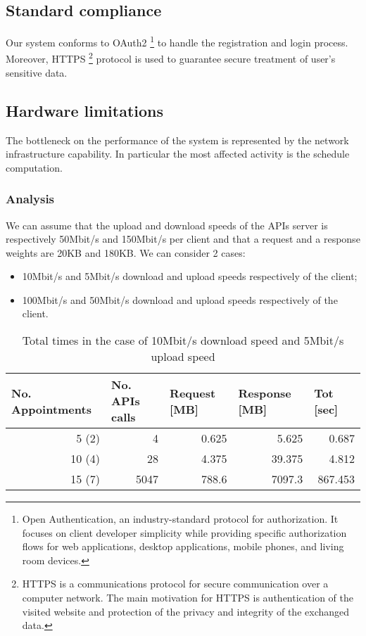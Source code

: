\subsection{Standard compliance}
Our system conforms to OAuth2 \footnote{Open Authentication, an industry-standard protocol for authorization. It focuses on client developer simplicity while providing specific authorization flows for web applications, desktop applications, mobile phones, and living room devices.} to handle the registration and login process. 
Moreover, HTTPS \footnote{HTTPS is a communications protocol for secure communication over a computer network. The main motivation for HTTPS is authentication of the visited website and protection of the privacy and integrity of the exchanged data.} protocol is used to guarantee secure treatment of user's sensitive data.

\subsection{Hardware limitations}
The bottleneck on the performance of the system is represented by the network infrastructure capability. In particular the most affected activity is the schedule computation.
\subsubsection{Analysis}
We can assume that the upload and download speeds of the APIs server is respectively 50Mbit/s and 150Mbit/s per client and that a request and a response weights are 20KB and 180KB.
We can consider 2 cases:
\begin{itemize}
\item 10Mbit/s and 5Mbit/s download and upload speeds respectively of the client;
\item 100Mbit/s and 50Mbit/s download and upload speeds respectively of the client.
\end{itemize}

\begin{table}[htbp]
  \centering
    \begin{tabular}{|r|r|r|r|r|}
    \hline
    \multicolumn{1}{|l|}{\textbf{No. Appointments}} & \multicolumn{1}{l|}{\textbf{No. APIs calls}} & \multicolumn{1}{l|}{\textbf{Request [MB]}} & \multicolumn{1}{l|}{\textbf{Response [MB]}} & \multicolumn{1}{l|}{\textbf{Tot [sec]}} \\ \hline
    5 (2)    & 4   & 0.625 & 5.625 & 0.687 \\ \hline
    10 (4)   & 28 & 4.375 & 39.375 & 4.812 \\ \hline
    15 (7)   & 5047 & 788.6 & 7097.3 & 867.453 \\ \hline
    \end{tabular}%
    \caption{Total times in the case of 10Mbit/s download speed and 5Mbit/s upload speed}
  \label{tab:addlabel}%
\end{table}%


